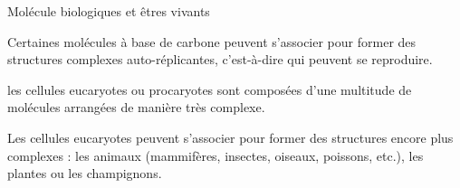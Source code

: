 \begin{doc}{Molécule biologiques et êtres vivants}
  \strut\vspace*{-20pt}
  
  \begin{importants}
    Certaines molécules à base de carbone peuvent s'associer pour former des structures complexes auto-réplicantes, c'est-à-dire qui peuvent se reproduire.
  \end{importants}
  \exemple* les cellules eucaryotes ou procaryotes sont composées d'une multitude de molécules arrangées de manière très complexe.

  \begin{importants}
    Les cellules eucaryotes peuvent s'associer pour former des structures encore plus complexes : les animaux (mammifères, insectes, oiseaux, poissons, etc.), les plantes ou les champignons.
  \end{importants}

  \vspace*{-14pt}
  \begin{center}
  \end{center}
\end{doc}